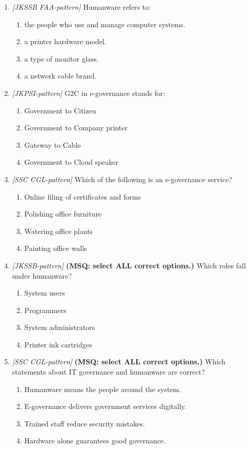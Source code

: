 \documentclass[11pt]{article}
\begin{document}
\begin{enumerate}[label=\textbf{Q\arabic*.}, leftmargin=*]
\item \textit{[JKSSB FAA-pattern]} Humanware refers to:
  \begin{enumerate}[label=\Alph*.]
    \item the people who use and manage computer systems.
    \item a printer hardware model.
    \item a type of monitor glass.
    \item a network cable brand.
  \end{enumerate}
\item \textit{[JKPSI-pattern]} G2C in e-governance stands for:
  \begin{enumerate}[label=\Alph*.]
    \item Government to Citizen
    \item Government to Company printer
    \item Gateway to Cable
    \item Government to Cloud speaker
  \end{enumerate}
\item \textit{[SSC CGL-pattern]} Which of the following is an e-governance service?
  \begin{enumerate}[label=\Alph*.]
    \item Online filing of certificates and forms
    \item Polishing office furniture
    \item Watering office plants
    \item Painting office walls
  \end{enumerate}
\item \textit{[JKSSB-pattern]} \textbf{(MSQ: select ALL correct options.)} Which roles fall under humanware?
  \begin{enumerate}[label=\Alph*.]
    \item System users
    \item Programmers
    \item System administrators
    \item Printer ink cartridges
  \end{enumerate}
\item \textit{[SSC CGL-pattern]} \textbf{(MSQ: select ALL correct options.)} Which statements about IT governance and humanware are correct?
  \begin{enumerate}[label=\Alph*.]
    \item Humanware means the people around the system.
    \item E-governance delivers government services digitally.
    \item Trained staff reduce security mistakes.
    \item Hardware alone guarantees good governance.
  \end{enumerate}
\end{enumerate}
\def\JKSSBLessonID{47}\def\JKSSBAnswers{0}
\end{document}
